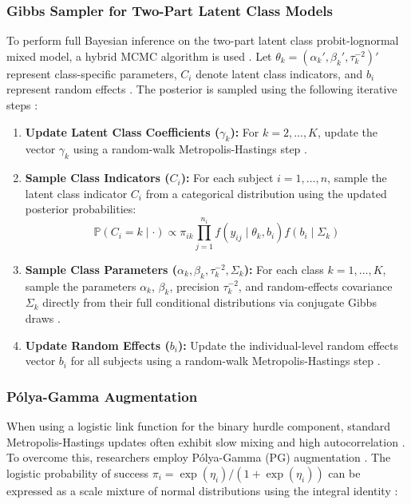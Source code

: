 \documentclass[11pt, a4paper]{article}
\begin{document}
\subsubsection{Gibbs Sampler for Two-Part Latent Class Models}
To perform full Bayesian inference on the two-part latent class probit-lognormal mixed model, a hybrid MCMC algorithm is used \cite{ref1}. Let $\theta_k = (\alpha_k', \beta_k', \tau_k^{-2})'$ represent class-specific parameters, $C_i$ denote latent class indicators, and $b_i$ represent random effects \cite{ref1}. The posterior is sampled using the following iterative steps \cite{ref1}:
\begin{enumerate}
    \item \textbf{Update Latent Class Coefficients ($\gamma_k$):} For $k = 2, \dots, K$, update the vector $\gamma_k$ using a random-walk Metropolis-Hastings step \cite{ref1}.
    \item \textbf{Sample Class Indicators ($C_i$):} For each subject $i = 1, \dots, n$, sample the latent class indicator $C_i$ from a categorical distribution using the updated posterior probabilities:
    \begin{equation}
    \mathbb{P}(C_i = k \mid \cdot) \propto \pi_{ik} \prod_{j=1}^{n_i} f(y_{ij} \mid \theta_k, b_i) f(b_i \mid \Sigma_k)
    \end{equation}
    \item \textbf{Sample Class Parameters ($\alpha_k, \beta_k, \tau_k^{-2}, \Sigma_k$):} For each class $k = 1, \dots, K$, sample the parameters $\alpha_k$, $\beta_k$, precision $\tau_k^{-2}$, and random-effects covariance $\Sigma_k$ directly from their full conditional distributions via conjugate Gibbs draws \cite{ref1}.
    \item \textbf{Update Random Effects ($b_i$):} Update the individual-level random effects vector $b_i$ for all subjects using a random-walk Metropolis-Hastings step \cite{ref1}.
\end{enumerate}

\subsubsection{P\'{o}lya-Gamma Augmentation}
When using a logistic link function for the binary hurdle component, standard Metropolis-Hastings updates often exhibit slow mixing and high autocorrelation \cite{ref42, ref43, ref44}. To overcome this, researchers employ P\'{o}lya-Gamma (PG) augmentation \cite{ref42, ref44, ref45}. The logistic probability of success $\pi_i = \exp(\eta_i) / (1 + \exp(\eta_i))$ can be expressed as a scale mixture of normal distributions using the integral identity \cite{ref44}:
\end{document}
